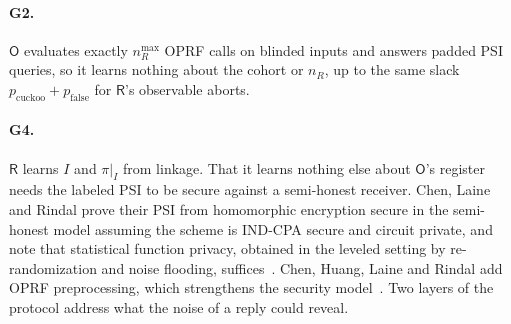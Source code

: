 \documentclass[11pt]{article}
\theoremstyle{definition}
\theoremstyle{plain}
\newcommand{\Party}[1]{\textsf{#1}}
\newcommand{\Rp}{\Party{R}}
\newcommand{\Op}{\Party{O}}
\begin{document}
\paragraph{G2.} $\Op$ evaluates exactly $n_R^{\max}$ OPRF calls on blinded inputs and answers padded PSI queries, so it learns nothing about the cohort or $n_R$, up to the same slack $p_{\mathrm{cuckoo}} + p_{\mathrm{false}}$ for $\Rp$'s observable aborts.

\paragraph{G4.} $\Rp$ learns $I$ and $\pi|_I$ from linkage. That it learns nothing else about $\Op$'s register needs the labeled PSI to be secure against a semi-honest receiver. Chen, Laine and Rindal prove their PSI from homomorphic encryption secure in the semi-honest model assuming the scheme is IND-CPA secure and circuit private, and note that statistical function privacy, obtained in the leveled setting by re-randomization and noise flooding, suffices~\cite{chen2017fast}. Chen, Huang, Laine and Rindal add OPRF preprocessing, which strengthens the security model~\cite{chen2018labeled}. Two layers of the protocol address what the noise of a reply could reveal.
\end{document}
